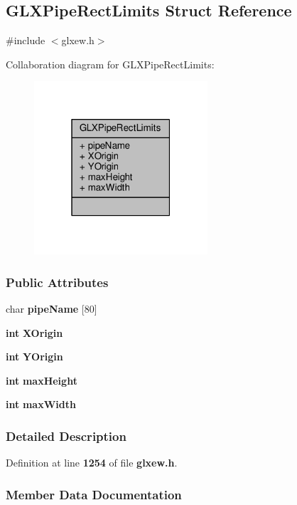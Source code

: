 \subsection{G\+L\+X\+Pipe\+Rect\+Limits Struct Reference}
\label{structGLXPipeRectLimits}


{\ttfamily \#include $<$glxew.\+h$>$}



Collaboration diagram for G\+L\+X\+Pipe\+Rect\+Limits\+:
\nopagebreak
\begin{figure}[H]
\begin{center}
\leavevmode
\includegraphics[width=183pt]{d6/d37/structGLXPipeRectLimits__coll__graph}
\end{center}
\end{figure}
\subsubsection*{Public Attributes}
\begin{DoxyCompactItemize}
\item 
char {\bf pipe\+Name} [80]
\item 
{\bf int} {\bf X\+Origin}
\item 
{\bf int} {\bf Y\+Origin}
\item 
{\bf int} {\bf max\+Height}
\item 
{\bf int} {\bf max\+Width}
\end{DoxyCompactItemize}


\subsubsection{Detailed Description}


Definition at line {\bf 1254} of file {\bf glxew.\+h}.



\subsubsection{Member Data Documentation}
